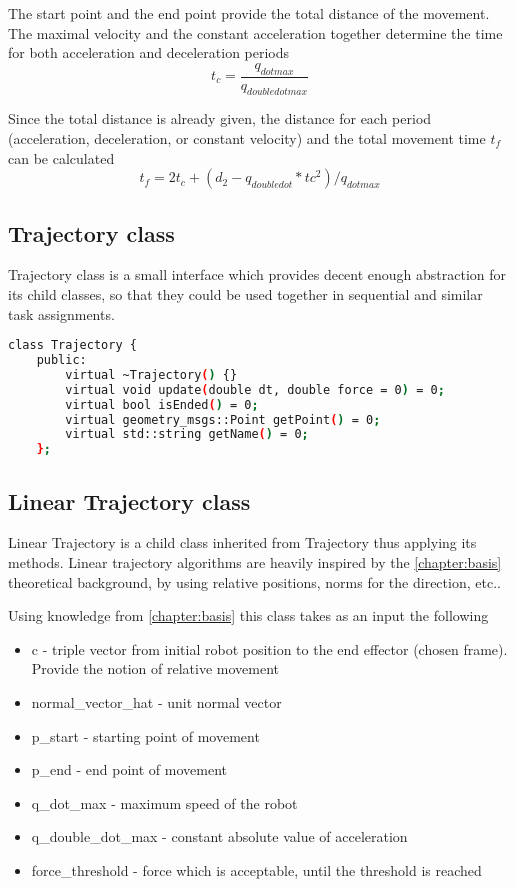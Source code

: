 The start point and the end point provide the total distance of the movement. The maximal velocity and the constant acceleration together determine the time for both acceleration and deceleration periods 
$$t_c = \frac{q_{dotmax}}{q_{doubledotmax}}$$ 

Since the total distance is already given, the distance for each period (acceleration, deceleration, or constant velocity) and the total movement time $t_f$ can be calculated 
$$t_f = 2t_c + (d_2 - q_{doubledot} * tc^2) / q_{dotmax} $$  

\subsection{Trajectory class}
Trajectory class is a small interface which provides decent enough abstraction for its child classes, so that they could be used together in sequential and similar task assignments. 

\begin{lstlisting}[language=bash]
class Trajectory {
    public:
        virtual ~Trajectory() {}
        virtual void update(double dt, double force = 0) = 0;
        virtual bool isEnded() = 0;
        virtual geometry_msgs::Point getPoint() = 0;
        virtual std::string getName() = 0;
    };
\end{lstlisting}

\subsection{Linear Trajectory class}

Linear Trajectory is a child class inherited from Trajectory thus applying its methods. Linear trajectory algorithms are heavily inspired by the \ref{chapter:basis} theoretical background, by using relative positions, norms for the direction, etc..

Using knowledge from \ref{chapter:basis} this class takes as an input the following 
\begin{itemize}
    \item c - triple vector from initial robot position to the end effector (chosen frame). Provide the notion of relative movement 
    \item normal\_vector\_hat - unit normal vector
    \item p\_start - starting point of movement
    \item p\_end - end point of movement
    \item q\_dot\_max - maximum speed of the robot
    \item q\_double\_dot\_max - constant absolute value of acceleration 
    \item force\_threshold - force which is acceptable, until the threshold is reached
\end{itemize}

